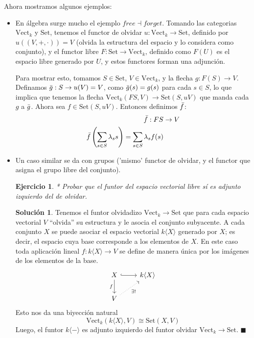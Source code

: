 \documentclass[12pt,letterpaper,titlepage]{article}
\newcommand{\xqed}[1]{%
  \leavevmode\unskip\penalty9999 \hbox{}\nobreak\hfill
  \quad\hbox{\ensuremath{#1}}}
\newtheorem{exe}{Ejercicio}
\theoremstyle{definition}
\newtheorem*{soltemp}{Solución}
\newenvironment{sol}[1]{%
    \begin{soltemp}#1}{%
    \xqed{\blacksquare}\end{soltemp}%
}
\newcommand\<{\langle}
\renewcommand\>{\rangle}
\newcommand{\Con}{\mathrm{Set}}
\newcommand{\Vect}{\mathrm{Vect}}
\begin{document}
Ahora mostramos algunos ejemplos:
\begin{itemize}
    \item En álgebra surge mucho el ejemplo $free\dashv forget$. Tomando las categorias $\Vect_k$ y $\Con$, tenemos el functor de olvidar $u:\Vect_k\to\Con$, definido por $u((V,+,\cdot))= V$ (olvida la estructura del espacio y lo considera como conjunto), y el functor libre $F:\Con\to\Vect_k$, definido como $F(U)$ es el espacio libre generado por $U$, y estos functores forman una adjunción.
    
    Para mostrar esto, tomamos $S\in\Con$, $V\in\Vect_k$, y la flecha $g:F(S)\to V$.
    Definamos $\Bar{g}:S\to u(V)=V$, como $\Bar{g}(s)=g(s)$ para cada $s\in S$, lo que implica que tenemos la flecha $\Vect_k(FS,V)\to\Con(S,uV)$ que manda cada $g$ a $\Bar{g}$.
    Ahora sea $f\in\Con(S,uV)$. Entonces definimos $\Bar{f}$:
    \begin{align*}
        \Bar{f}:FS & \to V \\
        \Bar{f}\left(\sum_{s\in S}\lambda_ss\right)=\sum_{s\in S}\lambda_s f(s)
    \end{align*}
    \item Un caso similar se da con grupos ('mismo' functor de olvidar, y el functor que asigna el grupo libre del conjunto).
    \begin{exe}%
      * Probar que el funtor del espacio vectorial libre sí es
      adjunto izquierdo del de olvidar.
    \end{exe}
    \begin{sol}
        Tenemos el funtor olvidadizo $\Vect_k\to\Con$ que para cada espacio vectorial $V$ “olvida” su estructura y le asocia el conjunto subyacente. A cada conjunto $X$ se puede asociar el espacio vectorial $k\langle X\rangle$ generado por $X$; es decir, el espacio cuya base corresponde a los elementos de $X$. En este caso toda aplicación lineal $f:k\langle X\rangle\to V$ se define de manera única por los imágenes de los elementos de la base. \[\begin{tikzcd}
    	{X} & {k\langle X\rangle} \\
    	{V}
    	\arrow["{f}"', from=1-1, to=2-1]
    	\arrow[from=1-1, to=1-2, hook]
    	\arrow["{\exists !}"', from=2-1, to=1-2, dotted]
    \end{tikzcd}\]
    Esto nos da una biyección natural
    $$\Vect_k(k\<X\>, V)
    \cong
    \Con(X,V)$$
    Luego, el funtor $k\<-\>$ es adjunto izquierdo del
    funtor olvidar $\Vect_k\to\Con$.
    \end{sol}
    

\end{itemize}
\end{document}
